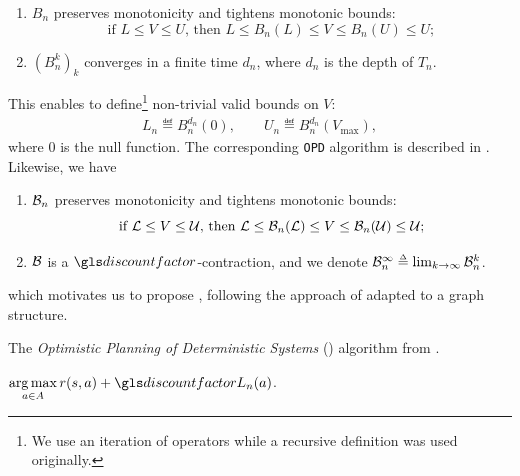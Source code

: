 \begin{lemma}[Properties of $B_n$]
	\begin{leftbar}[lemmabar]
	\label{lem:properties-b-tree}
	\begin{enumerate}[label=(\roman*)]
		\item $B_n$ preserves monotonicity and tightens monotonic bounds: $$
		\text{if } L\leq V\leq U \text{, then } L \leq B_n(L) \leq V \leq B_n(U) \leq U;
		$$
		\item $(B_n^k)_k$ converges in a finite time $d_n$, where $d_n$ is the depth of $T_n$. 
	\end{enumerate}
	\end{leftbar}
\end{lemma}
This enables \citet{Hren2008optimistic} to define\footnote{We use an iteration of operators while a recursive definition was used originally.} non-trivial valid bounds on $V$:
\begin{align}
\label{eq:opd-bounds}
L_n \eqdef B_n^{d_n}(0), \qquad U_n \eqdef B_n^{d_n}(V_{\max}),
\end{align}
where $0$ is the null function.
The corresponding \texttt{OPD} algorithm is described in . Likewise, we have
\begin{lemma}[Properties of $\cB_n$]
	\begin{leftbar}[lemmabar]
	\label{lem:properties-b-graph}
	\begin{enumerate}[label=(\roman*)]
		\item $\cB_n$ preserves monotonicity and tightens monotonic bounds: $$
		\text{if } \mathcal{L}\leq V\leq \mathcal{U} \text{, then } \mathcal{L} \leq \mathcal{B}_n(\mathcal{L}) \leq V \leq \mathcal{B}_n(\mathcal{U}) \leq \mathcal{U};
		$$
		\item $\mathcal{B}$ is a $\discount$-contraction, and we denote $\cB_n^{\infty} \eqdef \lim_{k\rightarrow \infty} \cB_n^k$.
	\end{enumerate}
	\end{leftbar}
\end{lemma}
which motivates us to propose , following the approach of  adapted to a graph structure.

\begin{algorithm}[th]
	\caption{The \emph{Optimistic Planning of Deterministic Systems} (\OPD) algorithm from \citep{Hren2008optimistic}.}
	\label{alg:opd}
	\DontPrintSemicolon
	\Return $\displaystyle\argmax_{a\in A} r(s, a) + \discount L_n(a)$. \;
\end{algorithm}

